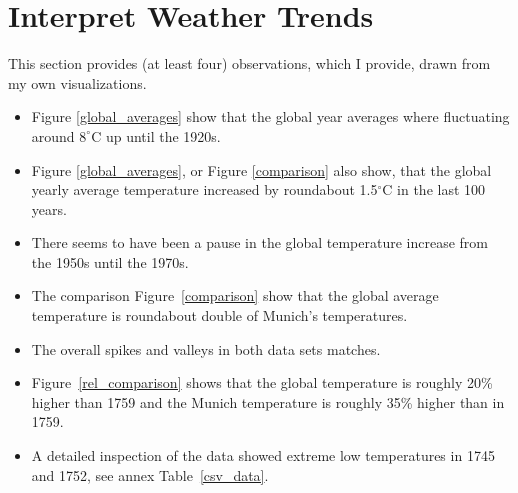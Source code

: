 \documentclass[DIV=11, a4paper, parskip=true]{scrartcl}
\begin{document}
\section{Interpret Weather Trends}

This section provides (at least four) observations, which I provide, drawn from my own
visualizations.

\begin{itemize}
\item Figure \ref{global_averages} show that the global year averages where fluctuating around
$8^\circ$C up until the 1920s.
\item Figure \ref{global_averages}, or Figure \ref{comparison} also show, that the global
yearly average temperature increased by roundabout 1.5$^\circ$C in the last 100 years.
\item There seems to have been a pause in the global temperature increase from the 1950s until
the 1970s.
\item The comparison Figure~\ref{comparison} show that the global average temperature is
roundabout double of Munich's temperatures.
\item The overall spikes and valleys in both data sets matches.
\item Figure~\ref{rel_comparison} shows that the global temperature is roughly 20\% higher than
1759 and the Munich temperature is roughly 35\% higher than in 1759.
\item A detailed inspection of the data showed extreme low temperatures in 1745 and 1752, see
annex Table~\ref{csv_data}.
\end{itemize}


\end{document}
